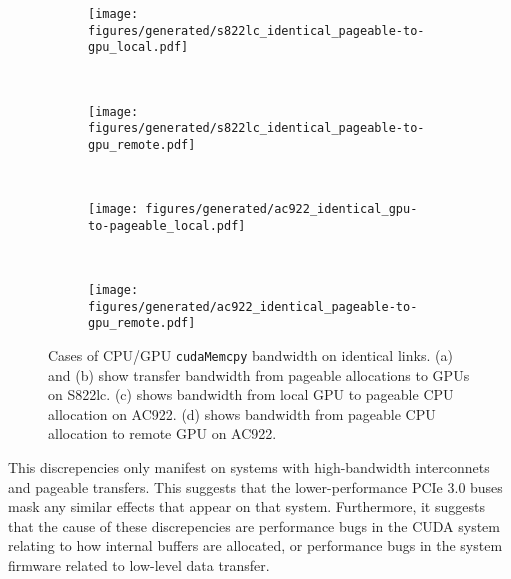 \begin{figure}[ht]
	\centering
	\begin{subfigure}[b]{0.31\textwidth}
		\texttt{[image: figures/generated/s822lc\_identical\_pageable-to-gpu\_local.pdf]}
		\caption{}
		\label{fig:explicit-identical-s822lc-local}
	\end{subfigure}
	~
	\begin{subfigure}[b]{0.31\textwidth}
		\texttt{[image: figures/generated/s822lc\_identical\_pageable-to-gpu\_remote.pdf]}
		\caption{}
		\label{fig:explicit-identical-s822lc-remote}
	\end{subfigure}
	\\
	\begin{subfigure}[b]{0.31\textwidth}
		\texttt{[image: figures/generated/ac922\_identical\_gpu-to-pageable\_local.pdf]}
		\caption{}
		\label{fig:explicit-identical-ac922-local}
	\end{subfigure}
	~
	\begin{subfigure}[b]{0.31\textwidth}
		\texttt{[image: figures/generated/ac922\_identical\_pageable-to-gpu\_remote.pdf]}
		\caption{}
		\label{fig:explicit-identical-ac922-remote}
	\end{subfigure}
	\caption[CPU/GPU \texttt{cudaMemcpy} bandwidth on identical links]{
		Cases of CPU/GPU \texttt{cudaMemcpy} bandwidth on identical links.
		(a) and (b) show transfer bandwidth from pageable allocations to GPUs on S822lc.
		(c) shows bandwidth from local GPU to pageable CPU allocation on AC922.
		(d) shows bandwidth from pageable CPU allocation to remote GPU on AC922.
	}
	\label{fig:explicit-identical}
\end{figure}

This discrepencies only manifest on systems with high-bandwidth interconnets and pageable transfers.
This suggests that the lower-performance PCIe 3.0 buses mask any similar effects that appear on that system.
Furthermore, it suggests that the cause of these discrepencies are performance bugs in the CUDA system relating to how internal buffers are allocated, or performance bugs in the system firmware related to low-level data transfer.

